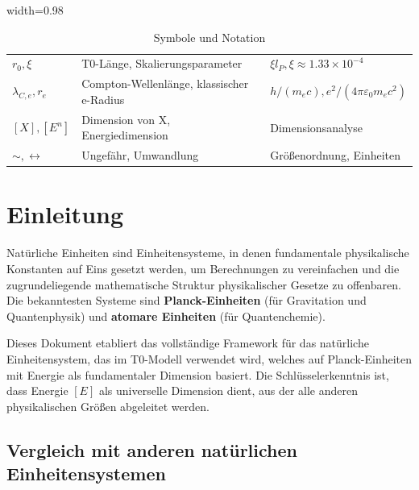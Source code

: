 {\begin{table}[htbp]
\begin{adjustbox}{width=0.98\textwidth}
\begin{tabular}{lll}
					$r_0, \xi$ & T0-Länge, Skalierungsparameter & $\xi l_P, \xi \approx 1.33 \times 10^{-4}$ \\
					$\lambda_{C,e}, r_e$ & Compton-Wellenlänge, klassischer e-Radius & $h/(m_e c), e^2/(4\pi\varepsilon_0 m_e c^2)$ \\
					$[X], [E^n]$ & Dimension von X, Energiedimension & Dimensionsanalyse \\
					$\sim, \leftrightarrow$ & Ungefähr, Umwandlung & Größenordnung, Einheiten \\
					\bottomrule
				\end{tabular}
			\end{adjustbox}
			\caption{Symbole und Notation}
			\label{tab:symbole}
		\end{table}
	}

	\section{Einleitung}
	
	Natürliche Einheiten sind Einheitensysteme, in denen fundamentale physikalische Konstanten auf Eins gesetzt werden, um Berechnungen zu vereinfachen und die zugrundeliegende mathematische Struktur physikalischer Gesetze zu offenbaren. Die bekanntesten Systeme sind \textbf{Planck-Einheiten} (für Gravitation und Quantenphysik) und \textbf{atomare Einheiten} (für Quantenchemie).
	
	Dieses Dokument etabliert das vollständige Framework für das natürliche Einheitensystem, das im T0-Modell verwendet wird, welches auf Planck-Einheiten mit Energie als fundamentaler Dimension basiert. Die Schlüsselerkenntnis ist, dass Energie $[E]$ als universelle Dimension dient, aus der alle anderen physikalischen Größen abgeleitet werden.
	
	\subsection{Vergleich mit anderen natürlichen Einheitensystemen}
	
